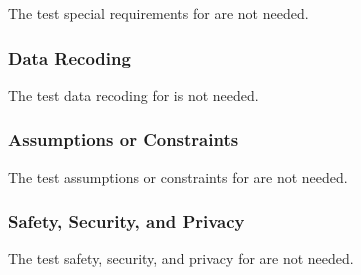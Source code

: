 The test special requirements for \TestIdName\xspace are not needed.

\subsubsection{Data Recoding}
\label{loc:TestDataRecoding\TestIdName}

The test data recoding for \TestIdName\xspace is not needed.

\subsubsection{Assumptions or Constraints}
\label{loc:TestAssumptionsOrConstraints\TestIdName}

The test assumptions or constraints for \TestIdName\xspace are not needed.

\subsubsection{Safety, Security, and Privacy}
\label{loc:TestSafetySecurityPrivacy\TestIdName}

The test safety, security, and privacy for \TestIdName\xspace are not needed.
